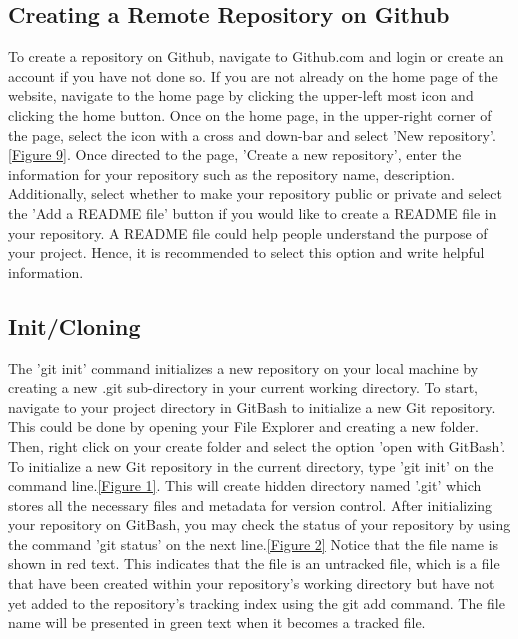 \documentclass[10pt,twocolumn]{article}
\begin{document}
\subsection{Creating a Remote Repository on Github}
To create a repository on Github, navigate to Github.com and login or create an account if you have not done so. If you are not already on the home page of the website, navigate to the home page by clicking the upper-left most icon and clicking the home button. Once on the home page, in the upper-right corner of the page, select the icon with a cross and down-bar and select 'New repository'. \ref{Figure 9}. Once directed to the page, 'Create a new repository', enter the information for your repository such as the repository name, description. Additionally, select whether to make your repository public or private and select the 'Add a README file' button if you would like to create a README file in your repository. A README file could help people understand the purpose of your project. Hence, it is recommended to select this option and write helpful information. 


\subsection{Init/Cloning}
The 'git init' command initializes a new repository on your local machine by creating a new .git sub-directory in your current working directory. 
To start, navigate to your project directory in GitBash to initialize a new Git repository. This could be done by opening your File Explorer and creating a new folder. Then, right click on your create folder and select the option 'open with GitBash'. To initialize a new Git repository in the current directory, type 'git init' on the command line.\ref{Figure 1}. This will create hidden directory named '.git' which stores all the necessary files and metadata for version control. After initializing your repository on GitBash, you may check the status of your repository by using the command 'git status' on the next line.\ref{Figure 2}  Notice that the file name is shown in red text. This indicates that the file is an untracked file, which is a file that have been created within your repository's working directory but have not yet added to the repository's tracking index using the git add command. The file name will be presented in green text when it becomes a tracked file. 
\end{document}
